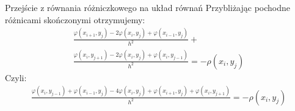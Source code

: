\begin{frame}{Przejście z równania różniczkowego na układ równań}
		Przybliżając pochodne różnicami skończonymi otrzymujemy:
		\begin{equation*}
		    \begin{split}
		    \frac{\varphi(x_{i+1},y_j) - 2 \varphi(x_i,y_j) + \varphi(x_{i-1}, y_j)}{h^2} +\\ \frac{\varphi(x_i,y_{j+1}) - 2 \varphi(x_i,y_j) + \varphi(x_{i},y_{j-1})}{h^2}=
		    -\rho(x_i,y_j) 
		\end{split}
		\end{equation*}
	Czyli:
		{\scriptsize
\begin{equation*}
		    \begin{split}
	 \frac{\varphi(x_{i},y_{j-1})  + \varphi(x_{i-1}, y_j)
	  - 4 \varphi(x_i,y_j)
	  +\varphi(x_{i+1},y_{j})
	 +\varphi(x_{i},y_{j+1})}{h^2} = -\rho(x_i,y_j) 
\end{split}
		\end{equation*}}

\end{frame}

